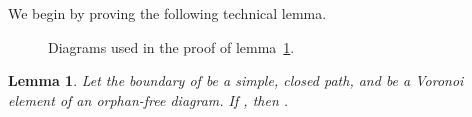 \documentclass[11pt]{article}
\newtheorem{lemma}{Lemma}
\begin{document}
We begin by proving the following technical lemma. 





\begin{figure}[htbp]
   \centering
	\quad\quad\quad
   \caption{Diagrams used in the proof of lemma~\ref{lem:RSC}. }
   \label{fig:RSC}
\end{figure}



\begin{lemma}\label{lem:RSC}
	Let the boundary  of  be a simple, closed path, 
		and  be a Voronoi element of an orphan-free diagram. 
	If , then . 		
\end{lemma}
\end{document}
